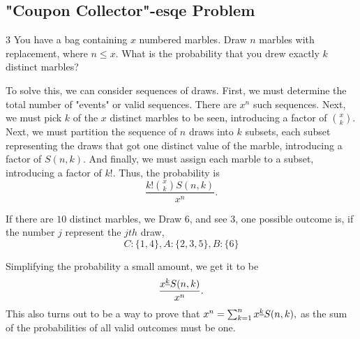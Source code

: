 \subsection{"Coupon Collector"-esqe Problem}
\begin{problem}
	3 You have a bag containing $x$ numbered marbles. Draw $n$ marbles with replacement, where $n\leq x$. What is the probability that you drew exactly $k$ distinct marbles?
\end{problem}
\begin{solution}
To solve this, we can consider sequences of draws. First, we must determine the total number of "events" or valid sequences. There are $x^n$ such sequences. Next, we must pick $k$ of the $x$ distinct marbles to be seen, introducing a factor of $\binom x k.$ Next, we must partition the sequence of $n$ draws into $k$ subsets, each subset representing the draws that got one distinct value of the marble, introducing a factor of $S(n,k)$. And finally, we must assign each marble to a subset, introducing a factor of $k!.$ Thus, the probability is \[\frac{k!\binom x k S(n,k)}{x^n}.\]
\begin{example}
		If there are $10$ distinct marbles, we Draw $6$, and see $3$, one possible outcome is, if the number $j$ represent the $jth$ draw, \[C:\{1,4\},A:\{2,3,5\},B:\{6\}\]
		
\end{example}
Simplifying the probability a small amount, we get it to be \[\frac{x^{\underline{k}}S(n,k)}{x^n}.\]
This also turns out to be a way to prove that $x^n=\sum_{k=1}^{n}x^{\underline{k}}S(n,k),$ as the sum of the probabilities of all valid outcomes must be one.
\end{solution}
% 
